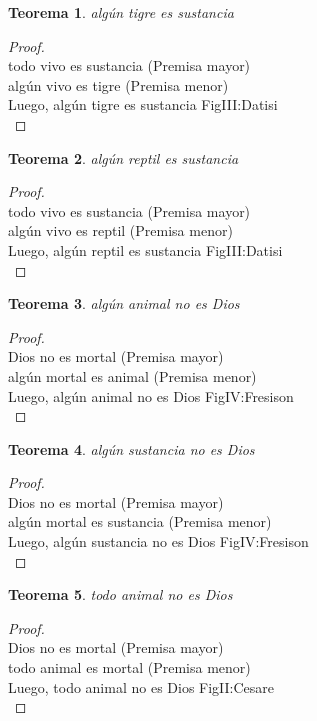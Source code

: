 ﻿\documentclass[12pt]{book}
\newtheorem{theorem}{Teorema}[chapter]
\newtheorem{proof}{Demostración}
\begin{document}
\begin{theorem}
algún tigre es sustancia
\label{th: 62}
\end{theorem}\begin{proof}\\todo vivo es sustancia	 (Premisa mayor) \\algún vivo es tigre	 (Premisa menor) \\Luego, algún tigre es sustancia	FigIII:Datisi \\ \end{proof}
\begin{theorem}
algún reptil es sustancia
\label{th: 63}
\end{theorem}\begin{proof}\\todo vivo es sustancia	 (Premisa mayor) \\algún vivo es reptil	 (Premisa menor) \\Luego, algún reptil es sustancia	FigIII:Datisi \\ \end{proof}
\begin{theorem}
algún animal no es Dios
\label{th: 64}
\end{theorem}\begin{proof}\\Dios no es mortal	 (Premisa mayor) \\algún mortal es animal	 (Premisa menor) \\Luego, algún animal no es Dios	FigIV:Fresison \\ \end{proof}
\begin{theorem}
algún sustancia no es Dios
\label{th: 65}
\end{theorem}\begin{proof}\\Dios no es mortal	 (Premisa mayor) \\algún mortal es sustancia	 (Premisa menor) \\Luego, algún sustancia no es Dios	FigIV:Fresison \\ \end{proof}
\begin{theorem}
todo animal no es Dios
\label{th: 66}
\end{theorem}\begin{proof}\\Dios no es mortal	 (Premisa mayor) \\todo animal es mortal	 (Premisa menor) \\Luego, todo animal no es Dios	FigII:Cesare \\ \end{proof}
\end{document}
